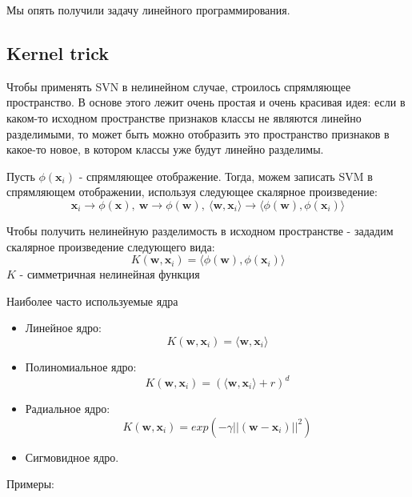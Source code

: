 \documentclass{article}
\begin{document}
Мы опять получили задачу линейного программирования.
\begin{figure}[h!]
\end{figure}


\subsection{Kernel trick} 
Чтобы применять SVN в нелинейном случае, строилось спрямляющее пространство. В основе этого лежит
очень простая и очень красивая идея: если в каком-то исходном пространстве признаков классы не являются
линейно разделимыми, то может быть можно отобразить это пространство признаков в какое-то новое, в
котором классы уже будут линейно разделимы.

Пусть $\phi (\boldsymbol{x}_i)$ - спрямляющее отображение. Тогда, можем записать SVM в спрямляющем отображении, используя следующее скалярное произведение:
$$ \boldsymbol{x}_i \rightarrow \phi (\boldsymbol{x}), ~ \boldsymbol{w} \rightarrow \phi (\boldsymbol{w}), ~ \langle \boldsymbol{w}, \boldsymbol{x}_i \rangle \rightarrow \langle  \phi (\boldsymbol{w}), \phi (\boldsymbol{x}_i) \rangle$$

Чтобы получить нелинейную разделимость в исходном пространстве - зададим скалярное произведение следующего вида:
$$K(\boldsymbol{w}, \boldsymbol{x}_i) = \langle  \phi (\boldsymbol{w}), \phi (\boldsymbol{x}_i) \rangle$$
$K$ - симметричная нелинейная функция



\begin{figure}[h!]
\end{figure}


Наиболее часто используемые ядра
\begin{itemize}
\item Линейное ядро:
$$K(\boldsymbol{w}, \boldsymbol{x}_i) = \langle \boldsymbol{w}, \boldsymbol{x}_i \rangle$$

\item Полиномиальное ядро:
$$K(\boldsymbol{w}, \boldsymbol{x}_i) = (\langle \boldsymbol{w}, \boldsymbol{x}_i \rangle + r)^d$$

\item Радиальное ядро:
$$K(\boldsymbol{w}, \boldsymbol{x}_i) = exp(-\gamma ||(\boldsymbol{w}-\boldsymbol{x}_i)||^2)$$
\item Сигмовидное ядро.
\end{itemize}
Примеры:
\end{document}
